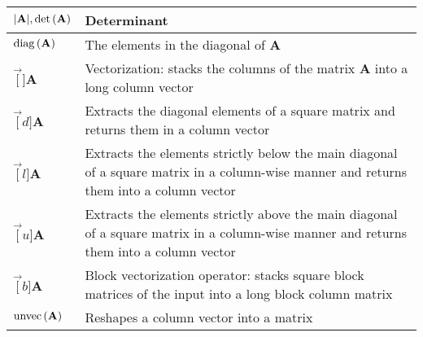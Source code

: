 \begin{xltabular}{\textwidth}{XX}
	\(\abs{\mathbf{A}}, \textnormal{det}\left( \mathbf{A} \right)\)                                      & Determinant                                                                                                                                                                     \\ \hline
	\(\operatorname{diag}\left(\mathbf{A}\right)\)                                                                                & The elements in the diagonal of \(\mathbf{A}\)                                                                                                                                  \\ \hline
	\(\vec[]{\mathbf{A}}\)                                                                               & Vectorization: stacks the columns of the matrix \(\mathbf{A}\) into a long column vector                                                                                        \\ \hline
	\(\vec[d]{\mathbf{A}}\)                                                                              & Extracts the diagonal elements of a square matrix and returns them
	in a column vector                                                                                                                                                                                                                                                                     \\ \hline
	\(\vec[l]{\mathbf{A}}\)                                                                              & Extracts the elements strictly below the main diagonal of a square matrix in a column-wise manner and returns them into a column vector                                         \\ \hline
	\(\vec[u]{\mathbf{A}}\)                                                                              & Extracts the elements strictly above the main diagonal of a square matrix in a column-wise manner and returns them into a column vector                                         \\ \hline
	\(\vec[b]{\mathbf{A}}\)                                                                              & Block vectorization operator: stacks square block matrices of the input into a long block column matrix                                                                         \\ \hline
	\(\operatorname{unvec}\left(\mathbf{A}\right)\)                                                                               & Reshapes a column vector into a matrix                                                                                                                                          \\ \hline

\end{xltabular}
